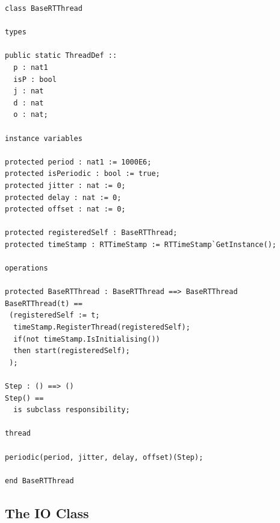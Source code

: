 \documentclass{overturerepchap}
\begin{document}
\begin{lstlisting}
class BaseRTThread

types

public static ThreadDef ::
  p : nat1
  isP : bool
  j : nat
  d : nat
  o : nat;
	
instance variables

protected period : nat1 := 1000E6;
protected isPeriodic : bool := true;
protected jitter : nat := 0;
protected delay : nat := 0;
protected offset : nat := 0;

protected registeredSelf : BaseRTThread;
protected timeStamp : RTTimeStamp := RTTimeStamp`GetInstance();

operations

protected BaseRTThread : BaseRTThread ==> BaseRTThread
BaseRTThread(t) ==
 (registeredSelf := t;
  timeStamp.RegisterThread(registeredSelf);
  if(not timeStamp.IsInitialising())
  then start(registeredSelf);   
 );

Step : () ==> ()
Step() ==
  is subclass responsibility;

thread

periodic(period, jitter, delay, offset)(Step);

end BaseRTThread
\end{lstlisting}

\subsection{The IO Class}
\end{document}
